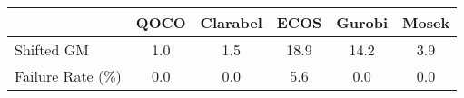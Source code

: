 \begin{tabular}{lccccc}
  \hline
   & \textbf{QOCO} & \textbf{Clarabel} & \textbf{ECOS} & \textbf{Gurobi} & \textbf{Mosek} \\ \hline
  Shifted GM & 1.0 & 1.5 & 18.9 & 14.2 & 3.9 \\ 
  Failure Rate (\%) & 0.0 & 0.0 & 5.6 & 0.0 & 0.0 \\ \hline 
\end{tabular}
